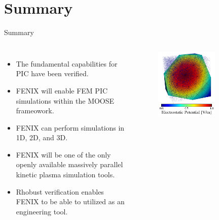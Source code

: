 \documentclass[aspectratio=169, 16pt]{beamer}
\begin{document}
\section{Summary}
\begin{frame}{Summary}
  \vfill{}
  \begin{columns}
    \begin{itemize}
      \item The fundamental capabilities for PIC have been verified.
      \item FENIX will enable FEM PIC simulations within the MOOSE frameowork.
      \item FENIX can perform simulations in 1D, 2D, and 3D.
      \item FENIX will be one of the only openly available massively parallel kinetic plasma simulation tools.
      \item Rhobust verification enables FENIX to be able to utilized as an engineering tool.
    \end{itemize}
    \begin{figure}[H]
      \includegraphics[width=0.7\textwidth]{figs/potential_visualiation.png}
     \end{figure}
  \end{columns}
\end{frame}
\begin{frame}
\end{frame}
\end{document}
